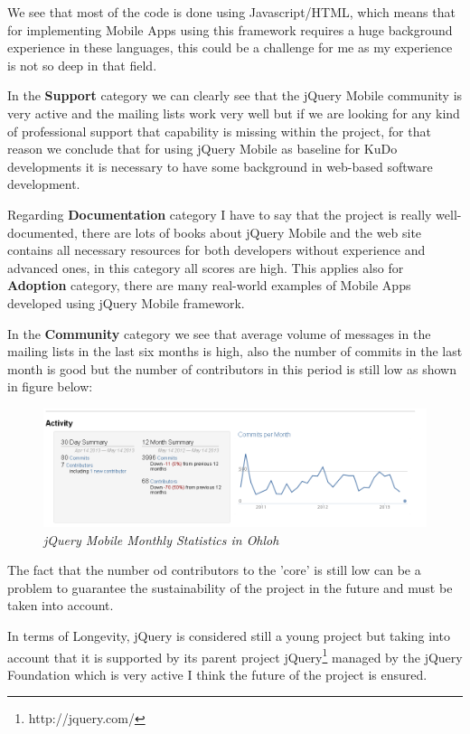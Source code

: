 \documentclass[a4paper,12pt]{book}
\begin{document}
We see that most of the code is done using Javascript/HTML, which means that for implementing Mobile Apps using this framework requires a huge background experience in these languages, this could be a challenge for me as my experience is not so deep in that field.

In the \textbf{Support} category we can clearly see that the jQuery Mobile community is very active and the mailing lists work very well but if we are looking for any kind of professional support that capability is missing within the project, for that reason we conclude that for using jQuery Mobile as baseline for KuDo developments it is necessary to have some background in web-based software development.

Regarding \textbf{Documentation} category I have to say that the project is really well-documented, there are lots of books about jQuery Mobile and the web site contains all necessary resources for both developers without experience and advanced ones, in this category all scores are high. This applies also for \textbf{Adoption} category, there are many real-world examples of Mobile Apps developed using jQuery Mobile framework.

In the \textbf{Community} category we see that average volume of messages in the mailing lists in the last six months is high, also the number of commits in the last month is good but the number of contributors in this period is still low as shown in figure below:

\begin{figure}[H]
    \centering
    \includegraphics[width=15cm, keepaspectratio]{img/jqueryohloh.png}
    \caption{\textit{jQuery Mobile Monthly Statistics in Ohloh}}
    \label{figure:jquerymonthly}
 \end{figure}
 
The fact that the number od contributors to the 'core' is still low can be a problem to guarantee the sustainability of the project in the future and must be taken into account.

In terms of Longevity, jQuery is considered still a young project but taking into account that it is supported by its parent project jQuery\footnote{http://jquery.com/}  managed by the jQuery Foundation\cite{jQuery Foundation}  which is very active I think the future of the project is ensured.
\end{document}
